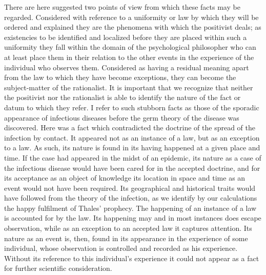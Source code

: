 \documentclass[12pt]{article}
\begin{document}
There are here suggested two points of view from
which these facts may be regarded. Considered with
reference to a uniformity or law by which they will
be ordered and explained they are the phenomena with
which the positivist deals; as existencies to be identified
and localized before they are placed within such a uniformity
they fall within the domain of the psychological
philosopher who can at least place them in their relation
to the other events in the experience of the individual
who observes them. Considered as having
a residual meaning apart from the law to which they
have become exceptions, they can become the subject-matter
of the rationalist. It is important that we
recognize that neither the positivist nor the rationalist
is able to identify the nature of the fact or datum
to which they refer. I refer to such stubborn facts as
those of the sporadic appearance of infectious diseases
before the germ theory of the disease was discovered.
Here was a fact which contradicted the doctrine of the
spread of the infection by contact. It appeared not as
an instance of a law, but as an exception to a law.
As such, its nature is found in its having happened
at a given place and time. If the case had appeared
in the midst of an epidemic, its nature as a case of the
infectious disease would have been cared for in the
accepted doctrine, and for its acceptance as an object
of knowledge its location in space and time as an event
would not have been required. Its geographical and
historical traits would have followed from the theory
of the infection, as we identify by our calculations the
happy fulfilment of Thales' prophecy. The happening
of an instance of a law is accounted for by the law.
Its happening may and in most instances does escape
observation, while as an exception to an accepted law
it captures attention. Its nature as an event is, then,
found in its appearance in the experience of some individual,
whose observation is controlled and recorded
as his experience. Without its reference to this individual's
experience it could not appear as a fact
for further scientific consideration.
\end{document}
